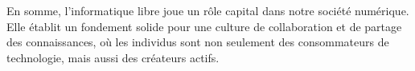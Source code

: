 %






En somme, l'informatique libre joue un rôle capital dans notre société numérique. Elle établit un fondement solide pour une culture de collaboration et de partage des connaissances, où les individus sont non seulement des consommateurs de technologie, mais aussi des créateurs actifs.

